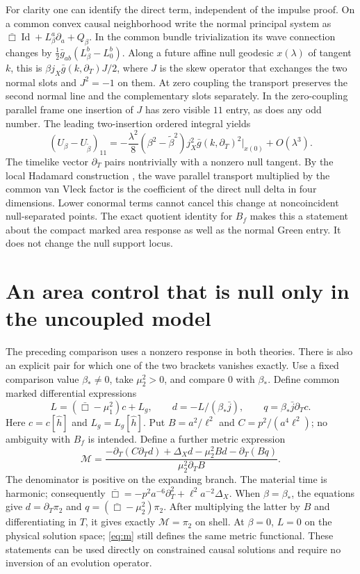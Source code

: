 \documentclass[11pt]{article}
\newcommand{\Id}{\operatorname{Id}}
\begin{document}
For clarity one can identify the direct term, independent of the impulse proof. On a common convex causal neighborhood write the normal principal system as $\bar\Box\Id+L_\beta^a\partial_a+Q_\beta$. In the common bundle trivialization its wave connection changes by $\tfrac12\bar g_{ab}(L_\beta^b-L_0^b)$. Along a future affine null geodesic $x(\lambda)$ of tangent $k$, this is $\beta j_X\bar g(k,\partial_T)J/2$, where $J$ is the skew operator that exchanges the two normal slots and $J^2=-1$ on them. At zero coupling the transport preserves the second normal line and the complementary slots separately. In the zero-coupling parallel frame one insertion of $J$ has zero visible $11$ entry, as does any odd number. The leading two-insertion ordered integral yields
\[
 (U_\beta-U_{\widetilde\beta})_{11}
  =-\frac{\lambda^2}{8}(\beta^2-\widetilde\beta^2)
       j_X^2\bar g(k,\partial_T)^2\big|_{x(0)}+O(\lambda^3).
\]
The timelike vector $\partial_T$ pairs nontrivially with a nonzero null tangent. By the local Hadamard construction \cite{BGP}, the wave parallel transport multiplied by the common van Vleck factor is the coefficient of the direct null delta in four dimensions. Lower conormal terms cannot cancel this change at noncoincident null-separated points. The exact quotient identity for $B_f$ makes this a statement about the compact marked area response as well as the normal Green entry. It does not change the null support locus.

\section{An area control that is null only in the uncoupled model}\label{sec:null}

The preceding comparison uses a nonzero response in both theories. There is also an explicit pair for which one of the two brackets vanishes exactly. Use a fixed comparison value $\beta_*\ne0$, take $\mu_2^2>0$, and compare $0$ with $\beta_*$. Define common marked differential expressions
\[
 L=(\bar\Box-\mu_1^2)c+L_g,\qquad
 d=-L/(\beta_*\bar j),\qquad q=\beta_*\bar j\partial_Tc .
\]
Here $c=c[\widehat h]$ and $L_g=L_g[\widehat h]$. Put $B=a^2/\ell^2$ and $C=p^2/(a^4\ell^2)$; no ambiguity with $B_f$ is intended. Define a further metric expression
\begin{equation}\label{eq:m}
 \mathcal M=\frac{-\partial_T(C\partial_Td)+\Delta_Xd-
                         \mu_2^2 B d-\partial_T(Bq)}{\mu_2^2\partial_TB} .
\end{equation}
The denominator is positive on the expanding branch. The material time is harmonic; consequently $\bar\Box=-p^2a^{-6}\partial_T^2+\ell^2a^{-2}\Delta_X$. When $\beta=\beta_*$, the equations give $d=\partial_T\pi_2$ and $q=(\bar\Box-\mu_2^2)\pi_2$. After multiplying the latter by $B$ and differentiating in $T$, it gives exactly $\mathcal M=\pi_2$ on shell. At $\beta=0$, $L=0$ on the physical solution space; \eqref{eq:m} still defines the same metric functional. These statements can be used directly on constrained causal solutions and require no inversion of an evolution operator.
\end{document}
